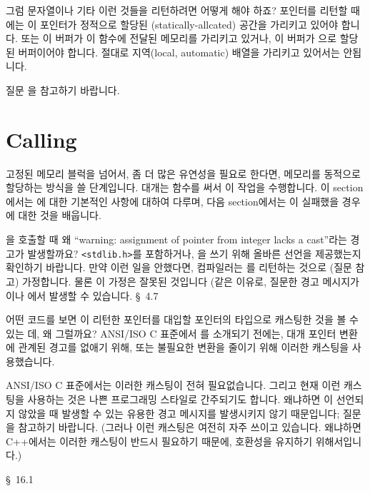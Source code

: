 \begin{faq}
	그럼 문자열이나 기타 이런 것들을 리턴하려면 어떻게 해야
	하죠?
\A
	포인터를 리턴할 때에는 이 포인터가 정적으로 할당된
	(statically-allcated) 공간을 가리키고 있어야 합니다.
	또는 이 버퍼가 이 함수에 전달된 메모리를 가리키고 있거나, 이 버퍼가
	으로 할당된 버퍼이어야 합니다.  절대로 지역(local,
	automatic) 배열을 가리키고 있어서는 안됩니다.
	
	질문 을 참고하기 바랍니다.
\end{faq}

\section{Calling }
고정된 메모리 블럭을 넘어서, 좀 더 많은 유연성을 필요로 한다면, 메모리를
동적으로 할당하는 방식을 쓸 단계입니다. 대개는  함수를 써서 이
작업을 수행합니다.
이 section에서는 에 대한 기본적인 사항에 대하여 다루며,
다음 section에서는 이 실패했을 경우에 대한 것을 배웁니다.

\begin{faq}
	을 호출할 때 왜 ``warning: assignment of pointer
	from integer lacks a cast''라는 경고가 발생할까요?
\A
	\verb+<stdlib.h>+를 포함하거나, 을 쓰기 위해 올바른
	선언을 제공했는지 확인하기 바랍니다. 만약 이런 일을 안했다면,
	컴파일러는 를 리턴하는 것으로 (질문  참고) 가정합니다.
	물론 이 가정은 잘못된 것입니다 (같은 이유로, 질문한 경고 메시지가
	이나 에서 발생할 수 있습니다.
\R
	\cite{hs} \S\ 4.7 
\end{faq}

\begin{faq}
	어떤 코드를 보면 이 리턴한 포인터를 대입할 포인터의
	타입으로 캐스팅한 것을 볼 수 있는 데, 왜 그럴까요?
\A
	ANSI/ISO C 표준에서 를 소개되기 전에는, 대개 포인터
	변환에 관계된 경고를 없애기 위해, 또는 불필요한 변환을 줄이기 위해
	이러한 캐스팅을 사용했습니다.

	ANSI/ISO C 표준에서는 이러한 캐스팅이 전혀 필요없습니다.
	그리고 현재 이런 캐스팅을 사용하는 것은 나쁜 프로그래밍 스타일로
	간주되기도 합니다.  왜냐하면 이 선언되지 않았을 때
	발생할 수 있는 유용한 경고 메시지를 발생시키지 않기 때문입니다;
	질문 을 참고하기 바랍니다.  (그러나 이런 캐스팅은 여전히
	자주 쓰이고 있습니다.  왜냐하면 C++에서는 이러한 캐스팅이 반드시
	필요하기 때문에, 호환성을 유지하기 위해서입니다.)

\R
	\cite{hs} \S\ 16.1 
\end{faq}

